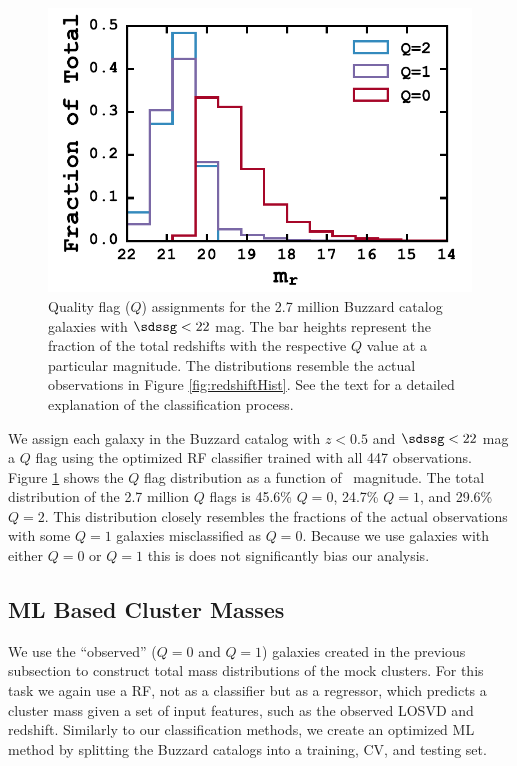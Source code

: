 \begin{figure}
	\includegraphics[width=\textwidth]{figures2/buzzardQHist.pdf} 
	\caption{Quality flag ($Q$) assignments for the 2.7 million Buzzard catalog galaxies with $\sdssg< 22$ mag. The bar heights represent the fraction of the total redshifts with the respective $Q$ value at a particular magnitude. The distributions resemble the actual observations in Figure \ref{fig:redshiftHist}. See the text for a detailed explanation of the classification process.} \label{fig:buzzardHist} 
\end{figure}

We assign each galaxy in the Buzzard catalog with $z<0.5$ and $\sdssg< 22$ mag a $Q$ flag using the optimized RF classifier trained with all 447 observations. Figure \ref{fig:buzzardHist} shows the $Q$ flag distribution as a function of \sdssr\ magnitude. The total distribution of the 2.7 million $Q$ flags is 45.6\% $Q=0$, 24.7\% $Q=1$, and 29.6\% $Q=2$. This distribution closely resembles the fractions of the actual observations with some $Q=1$ galaxies misclassified as $Q=0$. Because we use galaxies with either $Q=0$ or $Q=1$ this is does not significantly bias our analysis.

\subsection{ML Based Cluster Masses}\label{sec:ML based cluster masses}
We use the ``observed'' ($Q=0$ and $Q=1$) galaxies created in the previous subsection to construct total mass distributions of the mock clusters. For this task we again use a RF, not as a classifier but as a regressor, which predicts a cluster mass given a set of input features, such as the observed LOSVD and redshift. Similarly to our classification methods, we create an optimized ML method by splitting the Buzzard catalogs into a training, CV, and testing set. 

